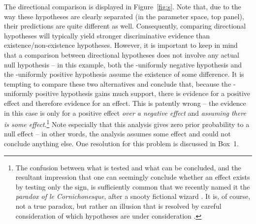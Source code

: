 The directional comparison is displayed in Figure~\ref{fig:s}.  Note that, due to the way these hypotheses are clearly separated (in the parameter space, top panel), their predictions are quite different as well. Consequently, comparing directional hypotheses will typically yield stronger discriminative evidence than existence/non-existence hypotheses. However, it is important to keep in mind that a comparison between directional hypotheses does not involve any actual null hypothesis -- in this example, both the \hyp{uniformly negative hypothesis} and the \hyp{uniformly positive hypothesis} assume the existence of some difference.  It is tempting to compare these two alternatives and conclude that, because the \hyp{uniformly positive hypothesis} gains much support, there is evidence for a positive effect and therefore evidence for an effect.  This is patently wrong -- the evidence in this case is only for a positive effect \emph{over a negative effect} and \emph{assuming there is some effect}.\footnote{The confusion between what is tested and what can be concluded, and the resultant impression that one can seemingly conclude whether an effect exists by testing only the sign, is sufficiently common that we recently named it the \emph{paradox of le Cornichonesque}, after a snooty fictional wizard \cite{EtzSI}. It is, of course, not a true paradox, but rather an illusion that is resolved by careful consideration of which hypotheses are under consideration \cite{RouderSI}.} Note especially that this analysis gives zero prior probability to a null effect -- in other words, the analysis assumes some effect and could not conclude anything else. One resolution for this problem is discussed in Box~1.

